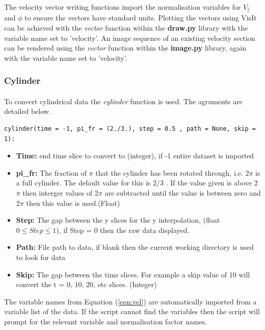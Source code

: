 \documentclass[12pt,a4paper]{article}
\begin{document}
The velocity vector writing functions import the normalisation variables for $V_{\parallel}$ and $\phi$ to ensure the vectors have standard units. Plotting the vectors using VisIt can be achieved with the \textit{vector} function within the \textbf{draw.py} library with the variable name set to 'velocity'. An image sequence of an existing velocity section can be rendered using the \textit{vector} function within the \textbf{image.py} library, again with the variable name set to 'velocity'.

\subsubsection{Cylinder}
\label{sec:vel_cylinder}
\paragraph{}
To convert cylindrical data the \textit{cylinder} function is used. The agruments are detailed below.

\begin{verbatim}
cylinder(time = -1, pi_fr = (2./3.), step = 0.5 , path = None, skip = 1):
\end{verbatim}

\begin{itemize}
	\item{\textbf{Time:} end time slice to convert to (integer), if -1 entire dataset is imported}
	\item{\textbf{pi\_fr:} The fraction of $\pi$ that the cylinder has been rotated through, i.e. 2$\pi$ is a full cylinder. The default value for this is $2/3$ . If the value given is above 2$\pi$ then interger values of 2$\pi$ are subtracted until the value is between zero and 2$\pi$ then this value is used.(Float)}
	\item{\textbf{Step:} The gap between the y slices for the y interpolation, (float  $ 0 \leq Step \leq 1$), if Step = 0 then  the raw data displayed.}
	\item{\textbf{Path:} File path to data, if blank then the current working directory is used to look for data}
	\item{\textbf{Skip:} The gap between the time slices. For example a skip value of 10 will convert the t = 0, 10, 20, etc slices. (Integer)}
\end{itemize}

The variable names from Equation (\ref{eqn:vel}) are automatically imported from a variable list of the data. If the script cannot find the variables then the script will prompt for the relevant variable  and normalisation factor names.
\end{document}
